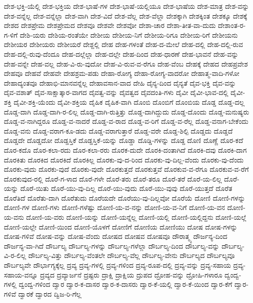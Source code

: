 {ದೇಶ-ಭಕ್ತಿ-ಯೆಲ್ಲಿ
ದೇಶ-ಭಕ್ತಿಯ
ದೇಶ-ಭಾಷೆ-ಗಳ
ದೇಶ-ಭಾಷೆ-ಯಲ್ಲಿಯೂ
ದೇಶ-ಭಾಷೆಯ
ದೇಶ-ಮಾತ್ರ
ದೇಶ-ವನ್ನು
ದೇಶ-ವನ್ನೆಲ್ಲ
ದೇಶ-ವನ್ನೆಲ್ಲಾ
ದೇಶ-ವಾಗಿ
ದೇಶ-ವಿದೆ
ದೇಶ-ವೆಲ್ಲ
ದೇಶ-ವೆಲ್ಲಾ
ದೇಶಕ್ಕಾಗಿ
ದೇಶಕ್ಕಿಂತ
ದೇಶಕ್ಕೂ
ದೇಶಕ್ಕೆ
ದೇಶದ
ದೇಶಪ್ರೇಮ
ದೇಶಪ್ರೇಮದ
ದೇಶವೂ
ದೇಶವೇ
ದೇಶವೋ
ದೇಶಾ-ಚಾರ
ದೇಶಾ-ತೀತ-ವಾ-ದುದು
ದೇಶಾಂತ-ರ-ಗ-ಳಿಗೆ
ದೇಶಿ-ಯರು
ದೇಶಿಯ-ರಂತೆಯೇ
ದೇಶೀಯ
ದೇಶೀಯ-ನಿಗೆ
ದೇಶೀಯ-ರಿಗೂ
ದೇಶೀಯ-ರಿಗೆ
ದೇಶೀಯನು
ದೇಶೀಯರ
ದೇಶೀಯರು
ದೇಶೀಯರೆ
ದೇಶ್ದಲ್ಲಿ
ದೇಹ
ದೇಹ-ಗಳಂತೆ
ದೇಹ-ದ-ಮೇಲೆ
ದೇಹ-ದಲ್ಲಿ
ದೇಹ-ದಲ್ಲಿ-ರುವ
ದೇಹ-ದಲ್ಲಿ-ರುವು-ದೆಂದೂ
ದೇಹ-ದಲ್ಲೆಲ್ಲಾ
ದೇಹ-ದಲ್ಲೇ
ದೇಹ-ದಿಂದ
ದೇಹ-ಧಾರಣೆ
ದೇಹ-ಭಾವನೆ
ದೇಹ-ವನ್ನು
ದೇಹ-ವನ್ನೇ
ದೇಹ-ವಲ್ಲ
ದೇಹ-ವಿ-ರು-ವುದೋ
ದೇಹ-ವಿ-ರುವ-ವ-ರೆಗೂ
ದೇಹ-ವೆಂಬ
ದೇಹಕ್ಕೆ
ದೇಹದ
ದೇಹಪ್ರವೇಶ
ದೇಹವೂ
ದೇಹವೆ
ದೇಹವೇ
ದೇಹಶ್ರಮ-ಪಡು
ದೇಹಾ-ರೋಗ್ಯ
ದೇಹಾ-ರೋಗ್ಯ-ವಾದರೋ
ದೇಹಾತ್ಮ-ವಾದಿ-ಗಳೋ
ದೇಹಾದ್ಯಂತವೂ
ದೇಹಾಭಿ-ಮಾನವನ್ನೆಲ್ಲ
ದೇಹಾವಸಾನ-ವಾದ
ದೇಹಿ
ದೈನ್ಯ-ದಿಂದ
ದೈನ್ಯತೆ
ದೈವ-ಭಕ್ತಿ
ದೈವ-ವನ್ನು
ದೈವ-ವಶಾತ್
ದೈವ-ಸಾಕ್ಷಾತ್ಕಾರ-ವಾಗದ
ದೈವತ್ವ-ವನ್ನು
ದೈವತ್ವದ
ದೈವದಂತಿ-ಗಳು
ದೈವೀ
ದೈವೀ-ಭಾವ-ದಲ್ಲಿ
ದೈವೀ-ಶಕ್ತಿ
ದೈವೀ-ಶಕ್ತಿ-ಯೆಂದು
ದೈವೀ-ಶಕ್ತಿಯ
ದೈಹಿಕ
ದೈಹಿಕ-ವಾಗಿ
ದೊಂಬಿ
ದೊಂಬಿಗೆ
ದೊಂಬಿಯ
ದೊಡ್ಡ
ದೊಡ್ಡ-ದಲ್ಲ
ದೊಡ್ಡ-ದಾಗಿ
ದೊಡ್ಡ-ದಾಗಿ-ರ-ಲಿಲ್ಲ
ದೊಡ್ಡ-ದಾಗಿ-ರುತ್ತಿತ್ತು
ದೊಡ್ಡ-ದಾಗಿದ್ದುದು
ದೊಡ್ಡ-ದೊಂದು
ದೊಡ್ಡ-ಮನುಷ್ಯರು
ದೊಡ್ಡ-ವ-ನಾಗಿದ್ದರೂ
ದೊಡ್ಡ-ವ-ನಾದರೆ
ದೊಡ್ಡ-ವ-ರಾದ
ದೊಡ್ಡ-ವ-ರಿಗೆ
ದೊಡ್ಡ-ವ-ರೆಲ್ಲ
ದೊಡ್ಡ-ವನಾಗ-ಬೇಕೆಂದು
ದೊಡ್ಡ-ವನು
ದೊಡ್ಡ-ವರಾಗ-ಕೂ-ಡದು
ದೊಡ್ಡ-ವರಾಗುತ್ತಾರೆ
ದೊಡ್ಡ-ವರೇ
ದೊಡ್ಡ-ಶಿಲ್ಪಿ
ದೊಡ್ಡದು
ದೊಡ್ಡದೆ
ದೊಡ್ಡದೇ
ದೊಡ್ಡದೋ
ದೊಡ್ಡಸ್ತಿಕೆ
ದೊಡ್ಡಸ್ತಿಕೆ-ಯನ್ನು
ದೊಡ್ಡಾ
ದೊಡ್ಡಿ-ಗಳನ್ನು
ದೊಡ್ದ
ದೊಣಿ
ದೊಣ್ಣೆ
ದೊರ-ಕದೆ
ದೊರ-ಕದೊ
ದೊರ-ಕಲಾ-ರದು
ದೊರ-ಕಲಾ-ರರು
ದೊರಕ-ದುದೇ
ದೊರಕಿ-ದಂತಾಗಿದೆ
ದೊರಕಿ-ದವು
ದೊರಕಿ-ದಾಗ
ದೊರಕಿತು
ದೊರಕಿದ
ದೊರಕಿದೆ
ದೊರಕಿಲ್ಲ
ದೊರಕು-ವು-ದ-ರಿಂದ
ದೊರಕು-ವು-ದಿಲ್ಲ-ವೆಂದು
ದೊರಕು-ವು-ದೆಂದು
ದೊರಕು-ವುದು
ದೊರಕು-ವುದೆ
ದೊರಕು-ವುದೇ
ದೊರಕುತ್ತದೆ
ದೊರಕುತ್ತವೆ
ದೊರಕುವ-ವ-ರೆಗೂ
ದೊರಕುವ-ವ-ರೆಗೆ
ದೊರಕುವುದ-ರಲ್ಲಿ
ದೊರೆ-ಗ-ಳಾದ
ದೊರೆ-ಗಳೇ
ದೊರೆ-ತರು
ದೊರೆ-ತರೂ
ದೊರೆ-ತರೆ
ದೊರೆ-ಯ-ಲಿಲ್ಲ
ದೊರೆ-ಯನ್ನು
ದೊರೆ-ಯಿತು
ದೊರೆ-ಯು-ವು-ದಿಲ್ಲ
ದೊರೆ-ಯು-ವುದು
ದೊರೆ-ಯು-ವುವು
ದೊರೆ-ಯುತ್ತದೆ
ದೊರೆತ
ದೊರೆತಿದೆ
ದೊರೆತು-ದಾಗಿ
ದೊರೆತುದು
ದೊರೆಯದೇ
ದೊರೆಯು-ವು-ದಿಲ್ಲವೋ
ದೊರೆಯೆ
ದೋಣಿ
ದೋಣಿ-ಗಳನ್ನು
ದೋಣಿ-ಗಳ
ದೋಣಿ-ಗಳು
ದೋಣಿ-ಗಳೆಷ್ಟು
ದೋಣಿ-ಯ-ವ-ನನ್ನು
ದೋಣಿ-ಯ-ವ-ನಿಗೆ
ದೋಣಿ-ಯ-ವನ
ದೋಣಿ-ಯ-ವನು
ದೋಣಿ-ಯ-ವರು
ದೋಣಿ-ಯನ್ನು
ದೋಣಿ-ಯನ್ನೆಲ್ಲ
ದೋಣಿ-ಯಲ್ಲಿ
ದೋಣಿ-ಯಲ್ಲಿದ್ದನು
ದೋಣಿ-ಯಲ್ಲೆ
ದೋಣಿ-ಯಲ್ಲೇ
ದೋಣಿ-ಯಿಂದ
ದೋಣಿ-ಯೊಳಗೆ
ದೋಣಿಗೆ
ದೋಣಿಯ
ದೋಣಿಯು
ದೋಷ
ದೋಷ-ಗಳನ್ನು
ದೋಷ-ಗಳಿವೆ
ದೋಷ-ವನ್ನು
ದೋಷ-ವೆಂದು
ದೋಷದ
ದೋಷವ
ದೋಷವೂ
ದೌರಾತ್ಮ್ಯ
ದೌರ್ಜನ್ಯ-ದಿಂದ
ದೌರ್ಜನ್ಯ-ವಾ-ಗಿದೆ
ದೌರ್ಬಲ್ಯ
ದೌರ್ಬಲ್ಯ-ಗಳನ್ನು
ದೌರ್ಬಲ್ಯ-ಗಳೆಲ್ಲಾ
ದೌರ್ಬಲ್ಯ-ದಿಂದ
ದೌರ್ಬಲ್ಯ-ವನ್ನು
ದೌರ್ಬಲ್ಯ-ವಿ-ರ-ಲಿಲ್ಲ
ದೌರ್ಬಲ್ಯ-ವಿತ್ತು
ದೌರ್ಬಲ್ಯ-ವೆಂತಲೇ
ದೌರ್ಬಲ್ಯ-ವೆಲ್ಲ
ದೌರ್ಬಲ್ಯ-ವೇನು
ದೌರ್ಬಲ್ಯದ
ದೌರ್ಬಲ್ಯವೂ
ದೌರ್ಬಲ್ಯವೇ
ದೌರ್ಭಾಗ್ಯಕ್ಕೆಲ್ಲ
ದ್ರವ್ಯ
ದ್ರವ್ಯ-ಗಳಲ್ಲಿ
ದ್ರವ್ಯ-ಗಳಿಂದ
ದ್ರವ್ಯ-ರೂಪ-ದಲ್ಲಿ
ದ್ರವ್ಯ-ವನ್ನು
ದ್ರವ್ಯ-ಸಹಾಯ
ದ್ರವ್ಯ-ಸಹಾಯ-ವನ್ನೂ
ದ್ರವ್ಯದ
ದ್ರವ್ಯಾರ್ಜನೆ
ದ್ರಷ್ಟರು
ದ್ರಾಕ್ಷಿ
ದ್ರಾಕ್ಷಿಯ
ದ್ರುಪದ
ದ್ರೋಹ-ವನ್ನು
ದ್ರೋಹಿ-ಗಳಾರೂ
ದ್ವಂದ್ವ-ಗಳಲ್ಲಿ
ದ್ವಂದ್ವ-ಗಳಿಂದ
ದ್ವಾರ
ದ್ವಾರ-ಕ-ದಾಸರ
ದ್ವಾರ-ಕ-ದಾಸರು
ದ್ವಾರ-ಕೆ-ಯಲ್ಲಿ
ದ್ವಾರ-ಕೆ-ಯಿಂದ
ದ್ವಾರ-ಕೆಗೆ
ದ್ವಾರ-ಗಳಿವೆ
ದ್ವಾರಕೆ
ದ್ವಾರದ
ದ್ವಿಜ-ರಿ-ಗೆಲ್ಲ
}
